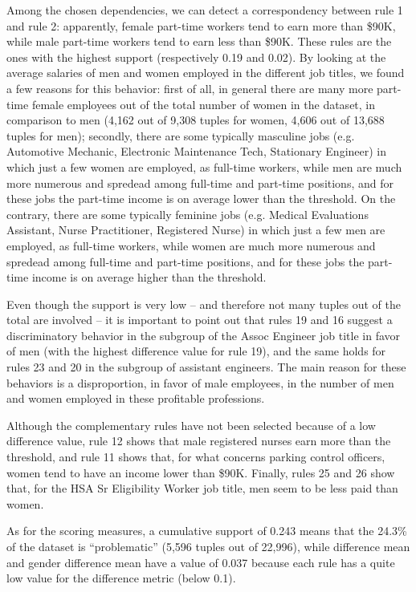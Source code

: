 Among the chosen dependencies, we can detect a correspondency between rule 1 and rule 2: apparently, female part-time workers tend to earn more than \$90K, while male part-time workers tend to earn less than \$90K. These rules are the ones with the highest support (respectively 0.19 and 0.02). By looking at the average salaries of men and women employed in the different job titles, we found a few reasons for this behavior: first of all, in general there are many more part-time female employees out of the total number of women in the dataset, in comparison to men (4,162 out of 9,308 tuples for women, 4,606 out of 13,688 tuples for men); secondly, there are some typically masculine jobs (e.g. Automotive Mechanic, Electronic Maintenance Tech, Stationary Engineer) in which just a few women are employed, as full-time workers, while men are much more numerous and spredead among full-time and part-time positions, and for these jobs the part-time income is on average lower than the threshold. On the contrary, there are some typically feminine jobs (e.g. Medical Evaluations Assistant, Nurse Practitioner, Registered Nurse) in which just a few men are employed, as full-time workers, while women are much more numerous and spredead among full-time and part-time positions, and for these jobs the part-time income is on average higher than the threshold.

Even though the support is very low -- and therefore not many tuples out of the total are involved -- it is important to point out that rules 19 and 16 suggest a discriminatory behavior in the subgroup of the Assoc Engineer job title in favor of men (with the highest difference value for rule 19), and the same holds for rules 23 and 20 in the subgroup of assistant engineers. The main reason for these behaviors is a disproportion, in favor of male employees, in the number of men and women employed in these profitable professions.

Although the complementary rules have not been selected because of a low difference value, rule 12 shows that male registered nurses earn more than the threshold, and rule 11 shows that, for what concerns parking control officers, women tend to have an income lower than \$90K. Finally, rules 25 and 26 show that, for the HSA Sr Eligibility Worker job title, men seem to be less paid than women.

As for the scoring measures, a cumulative support of 0.243 means that the 24.3\% of the dataset is ``problematic'' (5,596 tuples out of 22,996), while difference mean and gender difference mean have a value of 0.037 because each rule has a quite low value for the difference metric (below 0.1).

